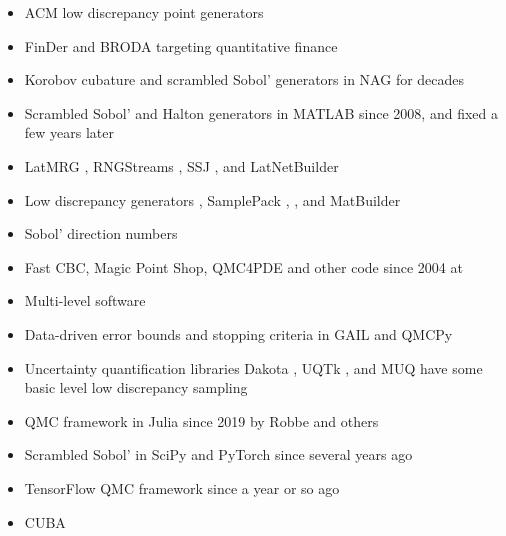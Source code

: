 \documentclass[graybox]{svmult}
\begin{document}
\begin{itemize}
    \item ACM low discrepancy point generators \cite{BraFox88,BraFoxNie92,HonHic00a}
    \item FinDer \cite{PasTra95,FinDer} and BRODA \cite{BRODA20a} targeting quantitative finance
    \item Korobov cubature and scrambled Sobol' generators in NAG \cite{NAG27} for decades
    \item Scrambled Sobol' and Halton generators in MATLAB \cite{MAT9.13} since 2008, and fixed a few years later
    \item LatMRG \cite{LEcCou97}, RNGStreams \cite{LEcEtal02},  SSJ \cite{LEc2002a,SSJ}, and LatNetBuilder \cite{LatNet}
    \item Low discrepancy generators \cite{FriKel02,FriKelweb}, SamplePack \cite{SamplePack}, \cite{GruWeb},  and MatBuilder \cite{paulin2022}
    \item Sobol' direction numbers \cite{JoeKuo03,JoeKuo08,SobolDirection}
    \item Fast CBC, Magic Point Shop, QMC4PDE and other code since 2004  at \cite{NuyWeb}
    \item Multi-level software \cite{GilesSoft,GilesQSoft}
    \item Data-driven error bounds and stopping criteria in GAIL \cite{ChoEtal21a} and QMCPy \cite{QMCPy2020a, ChoEtal22a}
    \item Uncertainty quantification libraries Dakota \cite{DakotaUsersManual}, UQTk \cite{DebEtal04,UQTk}, and MUQ \cite{MUQ}  have some basic level low discrepancy sampling
    \item QMC framework in Julia since 2019 \cite{QMCJulia} by Robbe and others
    \item Scrambled Sobol' in SciPy \cite{virtanen2020scipy} and PyTorch \cite{paszke2019pytorch} since several years ago
    \item TensorFlow QMC framework \cite{tfqfQMC2021a} since a year or so ago
    \item CUBA \cite{CUBA}
\end{itemize}
\end{document}
